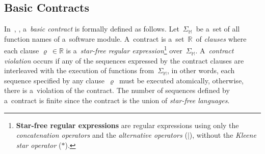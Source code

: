 \subsection{Basic Contracts}
\label{sec:basicContracts}

\begin{definition}
    In~\cite{contracts2017}, \cite{contracts2015}, a~\emph{basic contract} is
    formally defined as follows. Let~$ \Sigma_\mathbb{M} $~be a~set of all
    function names of a~software module. A~contract is
    a~set~$ \mathbb{R} $~of \emph{clauses} where each clause
    $ \varrho\ \in \mathbb{R} $ is a~\emph{star-free regular
    expression}\footnote{\textbf{Star-free regular expressions} are
    regular expressions using only the \emph{concatenation operators}
    and the \emph{alternative operators} ($ | $), without the
    \emph{Kleene star operator} ($ * $).} over~$ \Sigma_\mathbb{M} $.
    A~\emph{contract violation} occurs if any of the sequences expressed by
    the contract clauses are interleaved with the execution of functions
    from~$ \Sigma_\mathbb{M} $, in other words, each sequence specified by
    any clause~$ \varrho $~must be executed atomically, otherwise, there
    is a~violation of the contract. The number of sequences defined by
    a~contract is finite since the contract is the union of
    \emph{star-free languages}.
\end{definition}

